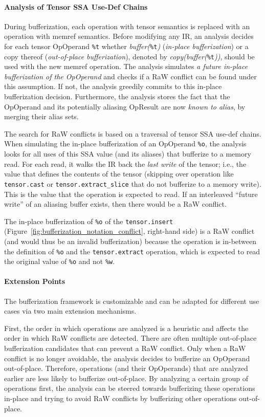 \paragraph{Analysis of Tensor SSA Use-Def Chains}
During bufferization, each operation with tensor semantics is replaced with an operation with memref semantics. 
Before modifying any IR, an analysis decides for each tensor OpOperand \texttt{\%t} whether \emph{buffer(}\texttt{\%t}\emph{)} (\emph{in-place bufferization}) or a copy thereof (\emph{out-of-place bufferization}), denoted by \emph{copy(buffer(}\texttt{\%t}\emph{))}, should be used with the new memref operation. 
The analysis simulates \emph{a future in-place bufferization of the OpOperand} and checks if a RaW conflict can be found under this assumption. 
If not, the analysis greedily commits to this in-place bufferization decision. 
Furthermore, the analysis stores the fact that the OpOperand and its potentially aliasing OpResult are now \emph{known to alias}, by merging their alias sets.

The search for RaW conflicts is based on a traversal of tensor SSA use-def chains. 
When simulating the in-place bufferization of an OpOperand \texttt{\%o}, the analysis looks for all uses of this SSA value (and its aliases) that bufferize to a memory read.
For each read, it walks the IR back the \emph{last write} of the tensor; i.e., the value that defines the contents of the tensor (skipping over operation like \texttt{tensor.cast} or \texttt{tensor.extract\_slice} that do not bufferize to a memory write). 
This is the value that the operation is expected to read. 
If an interleaved ``future write'' of an aliasing buffer exists, then there would be a RaW conflict.

The in-place bufferization of \texttt{\%o} of the \texttt{tensor.insert} (Figure~\ref{fig:bufferization_notation_conflict}, right-hand side) is a RaW conflict (and would thus be an invalid bufferization) because the operation is in-between the definition of \texttt{\%o} and the \texttt{tensor.extract} operation, which is expected to read the original value of \texttt{\%o} and not \texttt{\%w}.

\paragraph{Extension Points}
The bufferization framework is customizable and can be adapted for different use cases via two main extension mechanisms.

First, the order in which operations are analyzed is a heuristic and affects the order in which RaW conflicts are detected. 
There are often multiple out-of-place bufferization candidates that can prevent a RaW conflict. 
Only when a RaW conflict is no longer avoidable, the analysis decides to bufferize an OpOperand out-of-place. Therefore, operations (and their OpOperands) that are analyzed earlier are less likely to bufferize out-of-place. By analyzing a certain group of operations first, the analysis can be steered towards bufferizing these operations in-place and trying to avoid RaW conflicts by bufferizing other operations out-of-place.


